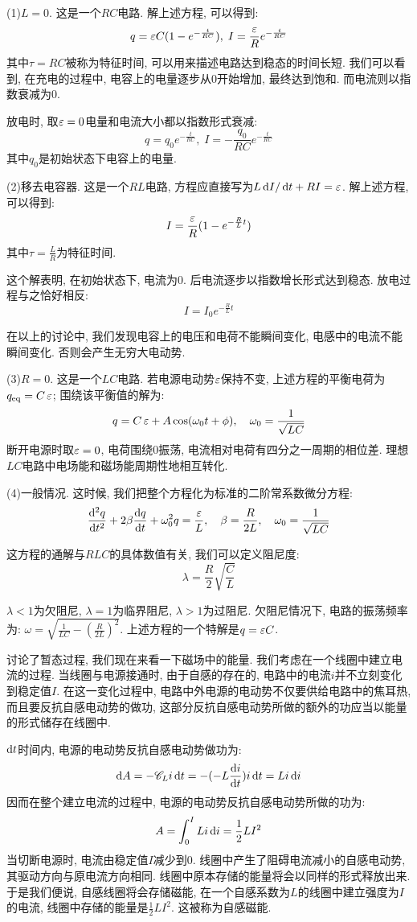 (1)$L=0$. 这是一个$RC$电路. 解上述方程, 可以得到:
\[
q =\mathop{}\!\varepsilon C(1-e^{-\frac{t}{RC}}),\; I=\frac{\mathop{}\!\varepsilon}{R} e^{-\frac{t}{RC}}
\]
其中$\tau=RC$被称为特征时间, 可以用来描述电路达到稳态的时间长短. 我们可以看到, 在充电的过程中, 电容上的电量逐步从$0$开始增加, 最终达到饱和. 而电流则以指数衰减为$0$.

放电时, 取$\mathop{}\!\varepsilon=0$电量和电流大小都以指数形式衰减:
\[
q = q_0e^{-\frac{t}{RC}},\; I = -\frac{q_0}{RC}e^{-\frac{t}{RC}}
\]
其中$q_0$是初始状态下电容上的电量.

(2)移去电容器. 这是一个$RL$电路, 方程应直接写为$L\mathop{}\!\mathrm{d} I/\mathop{}\!\mathrm{d} t+RI=\mathop{}\!\varepsilon$. 解上述方程, 可以得到:
\[
I =\frac{\mathop{}\!\varepsilon}{R}(1-e^{-\frac{R}{L}t})
\]
其中$\tau=\frac{L}{R}$为特征时间.

这个解表明, 在初始状态下, 电流为$0$. 后电流逐步以指数增长形式达到稳态. 放电过程与之恰好相反:
\[
I = I_0 e^{-\frac{R}{L}t}
\]

在以上的讨论中, 我们发现电容上的电压和电荷不能瞬间变化, 电感中的电流不能瞬间变化. 否则会产生无穷大电动势.

(3)$R=0$. 这是一个$LC$电路. 若电源电动势$\mathop{}\!\varepsilon$保持不变, 上述方程的平衡电荷为$q_{\mathrm{eq}}=C\mathop{}\!\varepsilon$; 围绕该平衡值的解为:
\[
q=C\mathop{}\!\varepsilon+A\cos(\omega_0 t+\phi),\quad \omega_0 = \frac{1}{\sqrt{LC}}
\]
断开电源时取$\mathop{}\!\varepsilon=0$, 电荷围绕$0$振荡, 电流相对电荷有四分之一周期的相位差. 理想$LC$电路中电场能和磁场能周期性地相互转化.

(4)一般情况. 这时候, 我们把整个方程化为标准的二阶常系数微分方程:
\[
\frac{\mathop{}\!\mathrm{d}^2 q}{\mathop{}\!\mathrm{d} t^2}+2\beta \frac{\mathop{}\!\mathrm{d} q}{\mathop{}\!\mathrm{d} t}+\omega_0^2 q = \frac{\mathop{}\!\varepsilon}{L},\quad \beta = \frac{R}{2L}, \quad \omega_0 = \frac{1}{\sqrt{LC}}
\]

这方程的通解与$RLC$的具体数值有关, 我们可以定义阻尼度:
\[
\lambda = \frac{R}{2}\sqrt{\frac{C}{L}}
\]

$\lambda<1$为欠阻尼, $\lambda=1$为临界阻尼, $\lambda>1$为过阻尼. 欠阻尼情况下, 电路的振荡频率为:
$\omega = \sqrt{\frac{1}{LC}-(\frac{R}{2L})^2}$. 上述方程的一个特解是$q=\mathop{}\!\varepsilon C$.

讨论了暂态过程, 我们现在来看一下磁场中的能量. 我们考虑在一个线圈中建立电流的过程. 当线圈与电源接通时, 由于自感的存在的, 电路中的电流$i$并不立刻变化到稳定值$I$. 在这一变化过程中, 电路中外电源的电动势不仅要供给电路中的焦耳热, 而且要反抗自感电动势的做功, 这部分反抗自感电动势所做的额外的功应当以能量的形式储存在线圈中.

$\mathop{}\!\mathrm{d} t$时间内, 电源的电动势反抗自感电动势做功为:
\[
\mathop{}\!\mathrm{d} A = -\mathscr C_{L} i \mathop{}\!\mathrm{d} t =-(-L\frac{\mathop{}\!\mathrm{d} i}{\mathop{}\!\mathrm{d} t})i\mathop{}\!\mathrm{d} t = Li\mathop{}\!\mathrm{d} i
\]
因而在整个建立电流的过程中, 电源的电动势反抗自感电动势所做的功为:
\[
A = \int_0^I Li\mathop{}\!\mathrm{d} i =\frac{1}{2}LI^2
\]
当切断电源时, 电流由稳定值$I$减少到$0$. 线圈中产生了阻碍电流减小的自感电动势, 其驱动方向与原电流方向相同. 线圈中原本存储的能量将会以同样的形式释放出来. 于是我们便说, 自感线圈将会存储磁能, 在一个自感系数为$L$的线圈中建立强度为$I$的电流, 线圈中存储的能量是$\frac{1}{2}LI^2$. 这被称为自感磁能.

